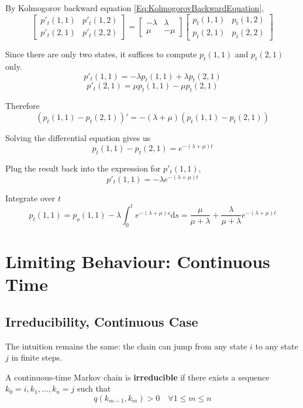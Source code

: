         By Kolmogorov backward equation \ref{Eq:KolmogorovBackwardEquation},
        \[
        \begin{bmatrix}
            p'_t(1,1) & p'_t(1,2)\\
            p'_t(2,1) & p'_t(2,2)
        \end{bmatrix} = 
        \begin{bmatrix}
            -\lambda & \lambda\\
            \mu & -\mu
        \end{bmatrix}
        \begin{bmatrix}
            p_t(1,1) & p_t(1,2)\\
            p_t(2,1) & p_t(2,2)
        \end{bmatrix}
        \]

        Since there are only two states, it suffices to compute $p_t(1,1)$ and $p_t(2,1)$ only.
        \[ p'_t(1,1) = -\lambda p_t(1,1) + \lambda p_t(2,1) \]
        \[ p'_t(2,1) = \mu p_t(1,1) - \mu p_t(2,1) \]

        Therefore
        \[ \left(p_t(1,1)-p_t(2,1)\right)' = -(\lambda + \mu)\left(p_t(1,1)-p_t(2,1)\right) \]

        Solving the differential equation gives us
        \[ p_t(1,1) - p_t(2,1) = e^{-(\lambda + \mu)t} \]

        Plug the result back into the expression for $p'_t(1,1)$,
        \[ p'_t(1,1) = -\lambda e^{-(\lambda + \mu)t} \]

        Integrate over $t$
        \[ p_t(1,1) = p_o(1,1) - \lambda\int_0^t e^{-(\lambda + \mu)s}\mathrm{d}s = \frac{\mu}{\mu + \lambda}+\frac{\lambda}{\mu + \lambda} e^{-(\lambda + \mu)t} \]


\section{Limiting Behaviour: Continuous Time}
    \subsection{Irreducibility, Continuous Case}
        The intuition remains the same: the chain can jump from any state $i$ to any state $j$ in finite steps.
        \begin{definition}
            A continuous-time Markov chain is \textbf{irreducible} if there exists a sequence $k_0 = i, k_1, \dots, k_n=j$ such that
            \[ q(k_{m-1},k_m) > 0 \quad \forall 1 \le m \le n \]
        \end{definition}


